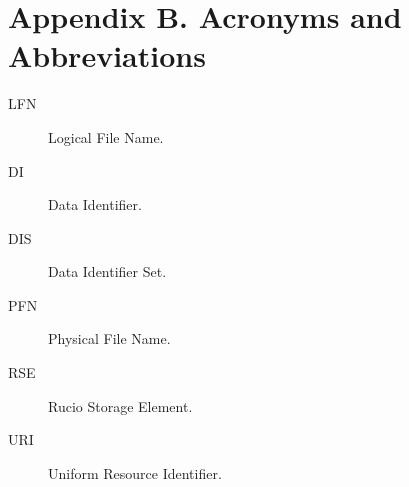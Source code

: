 \documentclass{atlasnote}
\begin{document}
\newpage
\section*{Appendix B. Acronyms and Abbreviations}
\label{Acronyms_and_Abbreviations:acronyms-and-abbreviations}
\begin{description}
\item[{LFN}] Logical File Name.
\item[{DI}] Data Identifier.
\item[{DIS}] Data Identifier Set.
\item[{PFN}] Physical File Name.
\item[{RSE}] Rucio Storage Element.
\item[{URI}] Uniform Resource Identifier.

\end{description}
\end{document}
